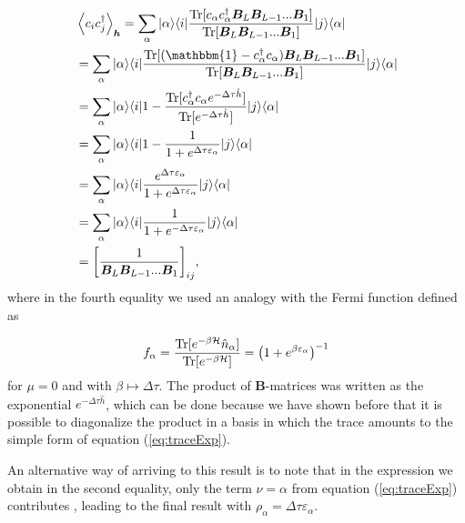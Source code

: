 \begin{equation}
\begin{split}
&\left\langle c_i c_j^\dagger \right\rangle_{\bm h} =\sum_{\alpha} | \alpha \rangle \langle i | \frac{ \Tr[c_{\alpha} c_\alpha^\dagger \bm B_L \bm B_{L-1} ... \bm B_1] }{\Tr [\bm B_L \bm B_{L-1} ... \bm B_1] } | j \rangle \langle \alpha | \\
&=\sum_{\alpha} | \alpha \rangle \langle i | \frac{ \Tr [( \mathbbm{1} - c_{\alpha}^\dagger c_\alpha) \bm B_L \bm B_{L-1} ... \bm B_1] }{\Tr [\bm B_L \bm B_{L-1} ... \bm B_1] } | j \rangle \langle \alpha | \\
&= \sum_{\alpha} | \alpha \rangle \langle i | 1 -  \frac{ \Tr [c_{\alpha}^\dagger c_\alpha e^{-\Delta \tau \hat{h}}]}{\Tr [e^{-\Delta \tau \hat{h}}] } | j \rangle \langle \alpha | \\
&= \sum_{\alpha} | \alpha \rangle \langle i | 1 -  \frac{1}{1 + e^{\Delta\tau \varepsilon_\alpha}} | j \rangle \langle \alpha | \\
&= \sum_{\alpha} | \alpha \rangle \langle i | \frac{e^{\Delta\tau \varepsilon_\alpha}}{1 + e^{\Delta\tau \varepsilon_\alpha}} | j \rangle \langle \alpha | \\
&= \sum_{\alpha} | \alpha \rangle \langle i | \frac{1}{1 + e^{-\Delta\tau \varepsilon_\alpha}} | j \rangle \langle \alpha | \\
&= \bigg[ \frac{1}{\bm B_L \bm B_{L-1} ... \bm B_{1}} \bigg]_{ij} ,
\end{split}
\end{equation}
where in the fourth equality we used an analogy with the Fermi function defined as 

\begin{equation}
f_\alpha = \frac{\operatorname{Tr}[e^{-\beta\mathcal{H}} \hat{n}_\alpha]}{\operatorname{Tr}[e^{-\beta\mathcal{H}} ]} = \big(1 + e^{\beta\varepsilon_\alpha} \big)^{-1}
\end{equation}
for $\mu = 0$ and with $\beta \mapsto \Delta \tau$. The product of $\bm B$-matrices was written as the exponential $e^{-\Delta \tau \hat{h}}$, which can be done because we have shown before that it is possible to diagonalize the product in a basis in which the trace amounts to the simple form of equation (\ref{eq:traceExp}).

An alternative way of arriving to this result is to note that in the expression we obtain in the second equality, only the term $\nu = \alpha$ from equation (\ref{eq:traceExp}) contributes \cite{santos_introduction_2003}, leading to the final result with $\rho_\alpha = \Delta\tau \varepsilon_\alpha$.

